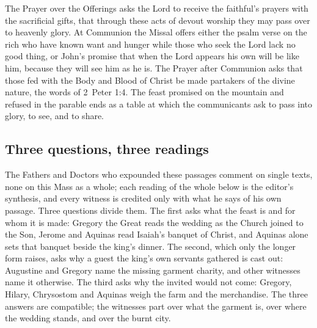 The Prayer over the Offerings asks the Lord to receive the faithful's prayers
with the sacrificial gifts, that through these acts of devout worship they may
pass over to heavenly glory. At Communion the Missal offers either the psalm
verse on the rich who have known want and hunger while those who seek the
Lord lack no good thing, or John's promise that when the Lord appears his own
will be like him, because they will see him as he is. The Prayer after
Communion asks that those fed with the Body and Blood of Christ be made
partakers of the divine nature, the words of 2~Peter 1:4. The feast promised
on the mountain and refused in the parable ends as a table at which the
communicants ask to pass into glory, to see, and to share.

\subsection{Three questions, three readings}

The Fathers and Doctors who expounded these passages comment on single texts,
none on this Mass as a whole; each reading of the whole below is the editor's
synthesis, and every witness is credited only with what he says of his own
passage. Three questions divide them. The first asks
what the feast is and for whom it is made: Gregory the Great reads the
wedding as the Church joined to the Son, Jerome and Aquinas read Isaiah's
banquet of Christ, and Aquinas alone sets that banquet beside the king's
dinner. The second, which only the longer form raises, asks why a guest the
king's own servants gathered is cast out: Augustine and Gregory name the
missing garment charity, and other witnesses name it otherwise. The third asks
why the invited would not come: Gregory, Hilary, Chrysostom and Aquinas weigh
the farm and the merchandise. The three answers are compatible; the
witnesses part over what the garment is, over where the wedding stands, and
over the burnt city.
